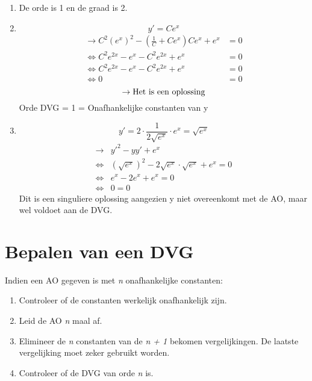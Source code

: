 {
\begin{enumerate}
\item 
De orde is 1 en de graad is 2.

\item 
$$y' = Ce^x$$
\begin{equation*}
\begin{split}
\rightarrow C^2(e^x)^2 - (\frac{1}{C} + Ce^x)Ce^x + e^x &  = 0 \\
\Leftrightarrow C^2e^{2x} - e^x - C^2e^{2x} + e^x &  = 0 \\
\Leftrightarrow C^2e^{2x} - e^x - C^2e^{2x} + e^x & = 0 \\
\Leftrightarrow 0 & =0
\end{split}
\end{equation*}
$$\rightarrow \hbox{Het is een oplossing}$$
Orde DVG = 1 = Onafhankelijke constanten van y

\item 
$$ y'  = 2 \cdot \frac{1}{2\sqrt{e^x}} \cdot e^x = \sqrt{e^x}$$
\begin{equation*}
\begin{split}
\rightarrow & y'^2 - yy'+e^x \\
\Leftrightarrow &  (\sqrt{e^x})^2 - 2\sqrt{e^x}\cdot\sqrt{e^x} + e^x  = 0 \\
\Leftrightarrow & e^x - 2e^x + e^x  = 0 \\
\Leftrightarrow & 0 = 0
\end{split}
\end{equation*}
Dit is een singuliere oplossing aangezien y niet overeenkomt met de AO, maar wel voldoet aan de DVG.

\end{enumerate}
}
\section{Bepalen van een DVG}
Indien een AO gegeven is met \textit{n} onafhankelijke constanten:
\begin{enumerate}
\item Controleer of de constanten werkelijk onafhankelijk zijn.
\item Leid de AO \textit{n} maal af.
\item Elimineer de \textit{n} constanten van de \textit{n + 1} bekomen vergelijkingen. De laatste vergelijking moet zeker gebruikt worden.
\item Controleer of de DVG van orde \textit{n} is.
\end{enumerate}

